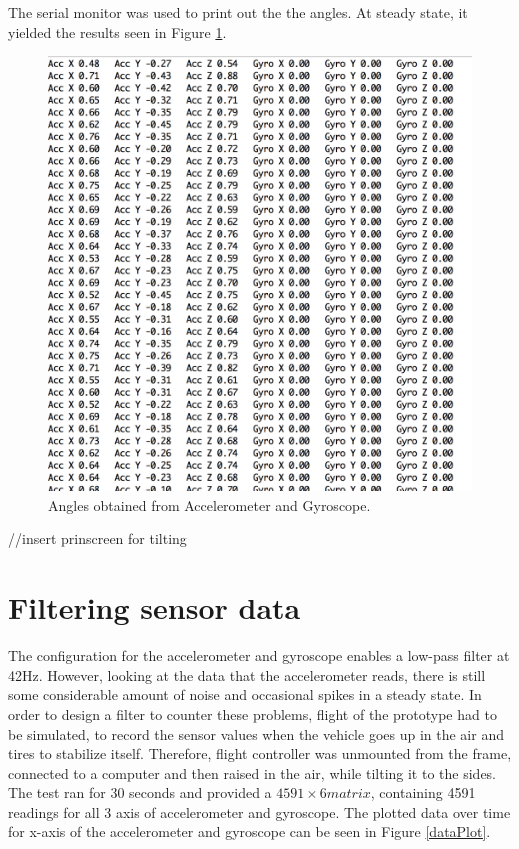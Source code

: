 The serial monitor was used to print out the the angles. At steady state, it yielded the results seen in Figure \ref{angles}.

\begin{figure}[H]
  \centering
    \includegraphics[width=1\textwidth]{images/accgy.png}
	\caption{Angles obtained from Accelerometer and Gyroscope.}
	\label{angles}
\end{figure}

//insert prinscreen for tilting 

\section{Filtering sensor data}
The configuration for the accelerometer and gyroscope enables a low-pass filter at 42Hz. However, looking at the data that the accelerometer reads, there is still some considerable amount of noise and occasional spikes in a steady state. In order to design a filter to counter these problems, flight of the prototype had to be simulated, to record the sensor values when the vehicle goes up in the air and tires to stabilize itself. Therefore, flight controller was unmounted from the frame, connected to a computer and then raised in the air, while tilting it to the sides. The test ran for 30 seconds and provided a $4591\times 6 matrix$, containing 4591 readings for all 3 axis of accelerometer and gyroscope. The plotted data over time for x-axis of the accelerometer and gyroscope can be seen in Figure \ref{dataPlot}.

